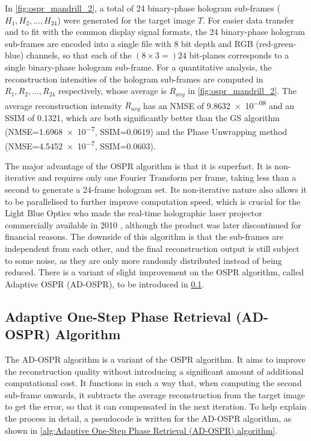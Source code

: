 In \cref{fig:ospr_mandrill_2}, a total of 24 binary-phase hologram sub-frames ($H_1, H_2, \ldots, H_{24}$) were generated for the target image $T$. For easier data transfer and to fit with the common display signal formats, the 24 binary-phase hologram sub-frames are encoded into a single file with 8 bit depth and RGB (red-green-blue) channels, so that each of the $(8\times 3 = )24$ bit-planes corresponds to a single binary-phase hologram sub-frame. For a quantitative analysis, the reconstruction intensities of the hologram sub-frames are computed in $R_1, R_2, \ldots, R_{24}$ respectively, whose average is $R_{avg}$ in \cref{fig:ospr_mandrill_2}. The average reconstruction intensity $R_{avg}$ has an NMSE of \num{9.8632e-08} and an SSIM of 0.1321, which are both significantly better than the GS algorithm (NMSE=\num{1.6968e-7}, SSIM=0.0619) and the Phase Unwrapping method (NMSE=\num{4.5452e-7}, SSIM=0.0603).

The major advantage of the OSPR algorithm is that it is superfast. It is non-iterative and requires only one Fourier Transform per frame, taking less than a second to generate a 24-frame hologram set. Its non-iterative nature also allows it to be parallelised to further improve computation speed, which is crucial for the Light Blue Optics who made the real-time holographic laser projector commercially available in 2010 \cite{Buckley2008}, although the product was later discontinued for financial reasons. The downside of this algorithm is that the sub-frames are independent from each other, and the final reconstruction output is still subject to some noise, as they are only more randomly distributed instead of being reduced. There is a variant of slight improvement on the OSPR algorithm, called Adaptive OSPR (AD-OSPR), to be introduced in \cref{sec:Adaptive One-Step Phase Retrieval (AD-OSPR) Algorithm}.



\subsection{Adaptive One-Step Phase Retrieval (AD-OSPR) Algorithm}\label{sec:Adaptive One-Step Phase Retrieval (AD-OSPR) Algorithm}

The AD-OSPR algorithm \cite{Kaczorowski2016} is a variant of the OSPR algorithm. It aims to improve the reconstruction quality without introducing a significant amount of additional computational cost. It functions in such a way that, when computing the second sub-frame onwards, it subtracts the average reconstruction from the target image to get the error, so that it can compensated in the next iteration. To help explain the process in detail, a pseudocode is written for the AD-OSPR algorithm, as shown in \cref{alg:Adaptive One-Step Phase Retrieval (AD-OSPR) algorithm}.

